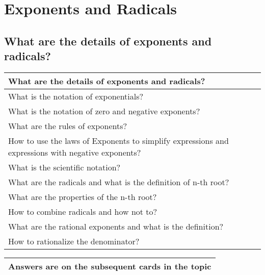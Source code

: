 \section{Exponents and Radicals}
\subsection{What are the details of exponents and radicals?}

\begin{small}
    \begin{tabularx}{1\textwidth}{
            p{}
        }
        \toprule
        \textbf{What are the details of exponents and radicals?} \\
        \midrule

        What is the notation of exponentials?
        \\
        \midrule


        What is the notation of zero and negative exponents?
        \\
        \midrule

        What are the rules of exponents?
        \\
        \midrule

        How to use the laws of Exponents to simplify expressions and expressions
        with negative exponents?
        \\
        \midrule

        What is the scientific notation?
        \\
        \midrule

        What are the radicals and what is the definition of n-th root?
        \\
        \midrule

        What are the properties of the n-th root?
        \\
        \midrule

        How to combine radicals and how not to?
        \\
        \midrule

        What are the rational exponents and what is the definition?
        \\
        \midrule

        How to rationalize the denominator?
        \\
        \bottomrule

    \end{tabularx}
\end{small}

\begin{small}
    \begin{tabularx}{1\textwidth}{
            p{}
        }
        \toprule
        \textbf{Answers are on the subsequent cards in the topic} \\
        \bottomrule
    \end{tabularx}
\end{small}


